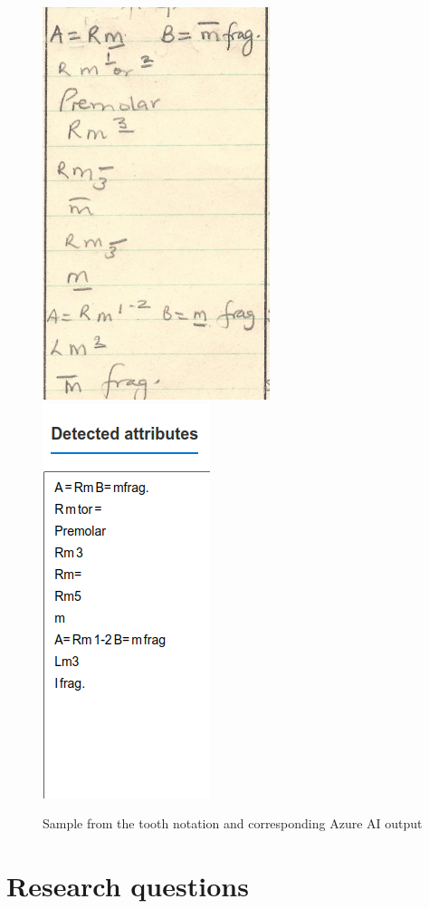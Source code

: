 \documentclass{article}
\begin{document}
\begin{figure}[h]
    \centering
    \includegraphics*[scale=0.43]{sample.png}
    \includegraphics[scale=0.43]{azure_result.png}
    \caption{Sample from the tooth notation and corresponding Azure AI output}
    \label{image:data_sample}
\end{figure}

\section{Research questions}
\end{document}

